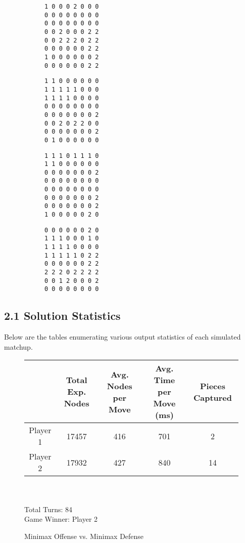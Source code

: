 \documentclass{article}
\begin{document}
\begin{figure}[H]
\begin{subfigure}{.5\textwidth}
\begin{verbatim}
1 0 0 0 2 0 0 0 
0 0 0 0 0 0 0 0 
0 0 0 0 0 0 0 0 
0 0 2 0 0 0 2 2 
0 0 2 2 2 0 2 2 
0 0 0 0 0 0 2 2 
1 0 0 0 0 0 0 2 
0 0 0 0 0 0 2 2 
\end{verbatim}
\end{subfigure}%
\begin{subfigure}{.5\textwidth}
\begin{verbatim}
1 1 0 0 0 0 0 0 
1 1 1 1 1 0 0 0 
1 1 1 1 0 0 0 0 
0 0 0 0 0 0 0 0 
0 0 0 0 0 0 0 2 
0 0 2 0 2 2 0 0 
0 0 0 0 0 0 0 2 
0 1 0 0 0 0 0 0 
\end{verbatim}
\end{subfigure}
\end{figure}

\begin{figure}[H]
\begin{subfigure}{.5\textwidth}
\begin{verbatim}
1 1 1 0 1 1 1 0 
1 1 0 0 0 0 0 0 
0 0 0 0 0 0 0 2 
0 0 0 0 0 0 0 0 
0 0 0 0 0 0 0 0 
0 0 0 0 0 0 0 2 
0 0 0 0 0 0 0 2 
1 0 0 0 0 0 2 0 
\end{verbatim}
\end{subfigure}%
\begin{subfigure}{.5\textwidth}
\begin{verbatim}
0 0 0 0 0 0 2 0 
1 1 1 0 0 0 1 0 
1 1 1 1 0 0 0 0 
1 1 1 1 1 0 2 2 
0 0 0 0 0 0 2 2 
2 2 2 0 2 2 2 2 
0 0 1 2 0 0 0 2 
0 0 0 0 0 0 0 0 
\end{verbatim}
\end{subfigure}
\end{figure}

\subsection{2.1 Solution Statistics}
Below are the tables enumerating various output statistics of each simulated matchup.


\begin{figure}[H]
\begin{tabular}{|c|c|c|c|c|}
\hline 
 & Total Exp. Nodes & Avg. Nodes per Move & Avg. Time per Move (ms) & Pieces Captured \\
\hline
 Player 1 & 17457 & 416 & 701 & 2 \\
\hline
 Player 2 & 17932 & 427 & 840 & 14 \\
\hline
\end{tabular}\\\\
Total Turns: 84\\
Game Winner: Player 2
\caption{Minimax Offense vs. Minimax Defense}
\end{figure}
\end{document}
